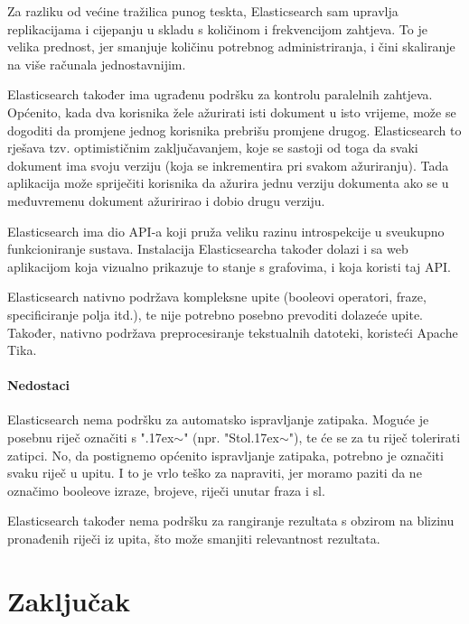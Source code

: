 \documentclass[a4paper,twoside,12pt]{scrreprt}
\begin{document}
Za razliku od većine tražilica punog teskta, Elasticsearch sam upravlja replikacijama i cijepanju u skladu s količinom i frekvencijom zahtjeva. To je velika prednost, jer smanjuje količinu potrebnog administriranja, i čini skaliranje na više računala jednostavnijim.

Elasticsearch također ima ugrađenu podršku za kontrolu paralelnih zahtjeva. Općenito, kada dva korisnika žele ažurirati isti dokument u isto vrijeme, može se dogoditi da promjene jednog korisnika prebrišu promjene drugog. Elasticsearch to rješava tzv. optimističnim zaključavanjem, koje se sastoji od toga da svaki dokument ima svoju verziju (koja se inkrementira pri svakom ažuriranju). Tada aplikacija može spriječiti korisnika da ažurira jednu verziju dokumenta ako se u međuvremenu dokument ažuririrao i dobio drugu verziju.

Elasticsearch ima dio API-a koji pruža veliku razinu introspekcije u sveukupno funkcioniranje sustava. Instalacija Elasticsearcha također dolazi i sa web aplikacijom koja vizualno prikazuje to stanje s grafovima, i koja koristi taj API.

Elasticsearch nativno podržava kompleksne upite (booleovi operatori, fraze, specificiranje polja itd.), te nije potrebno posebno prevoditi dolazeće upite. Također, nativno podržava preprocesiranje tekstualnih datoteki, koristeći Apache Tika.

\subsubsection{Nedostaci}

Elasticsearch nema podršku za automatsko ispravljanje zatipaka. Moguće je posebnu riječ označiti s "{\raise.17ex\hbox{$\scriptstyle\mathtt{\sim}$}}" (npr. "Stol{\raise.17ex\hbox{$\scriptstyle\mathtt{\sim}$}}"), te će se za tu riječ tolerirati zatipci. No, da postignemo općenito ispravljanje zatipaka, potrebno je označiti svaku riječ u upitu. I to je vrlo teško za napraviti, jer moramo paziti da ne označimo booleove izraze, brojeve, riječi unutar fraza i sl.

Elasticsearch također nema podršku za rangiranje rezultata s obzirom na blizinu pronađenih riječi iz upita, što može smanjiti relevantnost rezultata.

\chapter{Zaključak}
\end{document}
